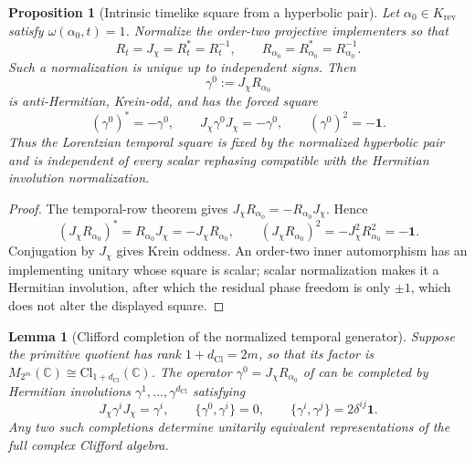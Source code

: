 \documentclass[11pt]{article}
\newtheorem{proposition}[theorem]{Proposition}
\newtheorem{lemma}[theorem]{Lemma}
\theoremstyle{definition}
\theoremstyle{remark}
\newcommand{\C}{\mathbb{C}}
\newcommand{\Cl}{\mathrm{Cl}}
\newcommand{\dCl}{d_{\mathrm{Cl}}}
\newcommand{\one}{\mathbf{1}}
\begin{document}
\begin{proposition}[Intrinsic timelike square from a hyperbolic pair]
\label{prop:forced-timelike-generator}
Let \(\alpha_0\in K_{\mathrm{rev}}\) satisfy
\(\omega(\alpha_0,t)=1\).  Normalize the order-two projective implementers so
that
\[
  R_t=J_\chi=R_t^*=R_t^{-1},
  \qquad
  R_{\alpha_0}=R_{\alpha_0}^*=R_{\alpha_0}^{-1}.
\]
Such a normalization is unique up to independent signs.  Then
\[
  \boxed{\ \gamma^0:=J_\chi R_{\alpha_0}\ }
\]
is anti-Hermitian, Krein-odd, and has the forced square
\[
  (\gamma^0)^*=-\gamma^0,
  \qquad
  J_\chi\gamma^0J_\chi=-\gamma^0,
  \qquad
  (\gamma^0)^2=-\one.
\]
Thus the Lorentzian temporal square is fixed by the normalized hyperbolic pair
and is independent of every scalar rephasing compatible with the Hermitian
involution normalization.
\end{proposition}

\begin{proof}
The temporal-row theorem gives
\(J_\chi R_{\alpha_0}=-R_{\alpha_0}J_\chi\).  Hence
\[
 (J_\chi R_{\alpha_0})^*=R_{\alpha_0}J_\chi
 =-J_\chi R_{\alpha_0},
 \qquad
 (J_\chi R_{\alpha_0})^2=-J_\chi^2R_{\alpha_0}^2=-\one.
\]
Conjugation by \(J_\chi\) gives Krein oddness.  An order-two inner
automorphism has an implementing unitary whose square is scalar; scalar
normalization makes it a Hermitian involution, after which the residual phase
freedom is only \(\pm1\), which does not alter the displayed square.
\end{proof}


\begin{lemma}[Clifford completion of the normalized temporal generator]
\label{lem:temporal-clifford-completion}
Suppose the primitive quotient has rank
\(1+\dCl=2m\), so that its factor is
\(M_{2^m}(\C)\cong\Cl_{1+\dCl}(\C)\).  The operator
\(\gamma^0=J_\chi R_{\alpha_0}\) of
 can be completed by Hermitian involutions
\(\gamma^1,\ldots,\gamma^{\dCl}\) satisfying
\[
  J_\chi\gamma^iJ_\chi=\gamma^i,
  \qquad
  \{\gamma^0,\gamma^i\}=0,
  \qquad
  \{\gamma^i,\gamma^j\}=2\delta^{ij}\one.
\]
Any two such completions determine unitarily equivalent representations of
the full complex Clifford algebra.
\end{lemma}
\end{document}
